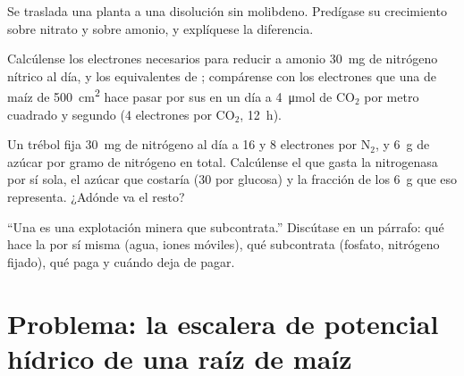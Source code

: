 \begin{exercise}[$\star\star$]\label{exo:b1:plant-water-minerals:9}
Se traslada una planta a una disolución sin molibdeno. Predígase su
crecimiento sobre nitrato y sobre amonio, y explíquese la diferencia.
\end{exercise}

\begin{exercise}[$\star\star\star$]\label{exo:b1:plant-water-minerals:10}
Calcúlense los electrones necesarios para reducir a amonio \qty{30}{mg} de
nitrógeno nítrico al día, y los equivalentes de ; compárense con los
electrones que una  de maíz de \qty{500}{cm^2} hace pasar por sus
 en un día a \qty{4}{\micro mol} de $\mathrm{CO_2}$ por metro
cuadrado y segundo (4 electrones por $\mathrm{CO_2}$, \qty{12}{h}).
\end{exercise}

\begin{exercise}[$\star\star\star$]\label{exo:b1:plant-water-minerals:11}
Un trébol fija \qty{30}{mg} de nitrógeno al día a \qty{16}{}  y
\qty{8}{} electrones por $\mathrm{N_2}$, y \qty{6}{g} de azúcar por gramo de
nitrógeno en total. Calcúlense el  que gasta la nitrogenasa por sí sola,
el azúcar que costaría (30  por glucosa) y la fracción de los \qty{6}{g}
que eso representa. ¿Adónde va el resto?
\end{exercise}

\begin{exercise}[$\star\star\star$]\label{exo:b1:plant-water-minerals:12}
``Una  es una explotación minera que subcontrata.'' Discútase en un
párrafo: qué hace la  por sí misma (agua, iones móviles), qué
subcontrata (fosfato, nitrógeno fijado), qué paga y cuándo deja de pagar.
\end{exercise}

\section{Problema: la escalera de potencial hídrico de una raíz de maíz}

